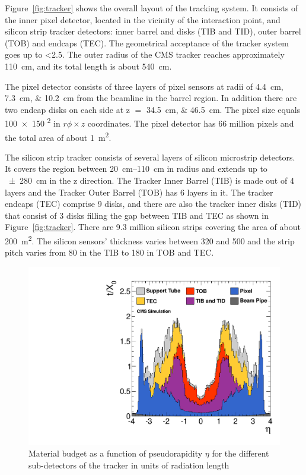 Figure~\ref{fig:tracker} shows the overall layout of the tracking system. It consists of the inner pixel detector,
located in the vicinity of the interaction point, and silicon strip tracker detectors: inner barrel and disks (TIB and
TID), outer barrel (TOB) and endcaps (TEC). The geometrical acceptance of the tracker system goes up to \abs\eta
\num{<2.5}. The outer radius of the CMS tracker reaches approximately \SI{110}{\cm}, and its total length is about
\SI{540}{\cm}.

The pixel detector consists of three layers of pixel sensors at radii of \SIlist{4.4;7.3;10.2}{\cm} from the beamline in
the barrel region. In addition there are two endcap disks on each side at \abs z $=$ \SIlist{34.5;46.5}{\cm}. The pixel
size equals \num{100x150} \si{\micron\squared} in $r \phi \times z$ coordinates. The pixel detector has 66 million
pixels and the total area of about \SI{1}{\m\squared}.

The silicon strip tracker consists of several layers of silicon microstrip detectors. It covers the region between
\SIrange{20}{110}{\cm} in radius and extends up to \SI{+-280}{\cm} in the z direction. The Tracker Inner Barrel (TIB) is
made out of 4 layers and the Tracker Outer Barrel (TOB) has 6 layers in it. The tracker endcaps (TEC) comprise 9 disks,
and there are also the tracker inner disks (TID) that consist of 3 disks filling the gap between TIB and TEC as shown in
Figure~\ref{fig:tracker}. There are \num{9.3} million silicon strips covering the area of about \SI{200}{\m\squared}.
The silicon sensors' thickness varies between \num{320} and \SI{500}{\micron} and the strip pitch varies from
\SI{80}{\micron} in the TIB to \SI{180}{\micron} in TOB and TEC.

\begin{figure}[!htbp]
  \centering
  \leavevmode
  \includegraphics[width=0.6\columnwidth]{tracker_material_budget}
  \caption[Material budget as a function of pseudorapidity $\eta$ for the different sub-detectors of the
  tracker]{Material budget as a function of pseudorapidity $\eta$ for the different sub-detectors of the tracker in
  units of radiation length \autocite{CMS_tracker_twiki}}
  \label{fig:tracker_material_budget}
\end{figure}

